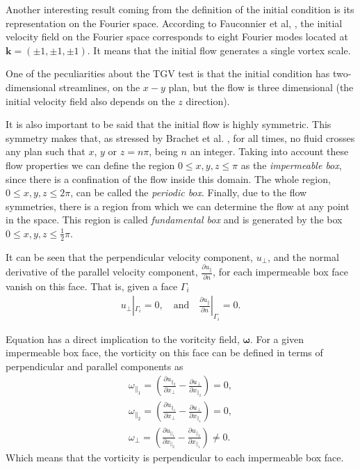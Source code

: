 Another interesting result coming from the definition of the initial condition  is its representation on the Fourier space. According to Fauconnier et al, \cite{fauconnier_construction_2009}, the initial velocity field on the Fourier space corresponds to eight Fourier modes located at $\mathbf{k}=(\pm1,\pm1,\pm1)$. It means that the initial flow generates a single  vortex scale.

One of the peculiarities about the TGV test is that the initial condition has two-dimensional streamlines, on the $x-y$ plan, but the flow is three dimensional (the initial velocity field also depends on the $z$ direction). 

It is also important to be said that the initial flow is highly symmetric. This symmetry makes that, as stressed by Brachet et al. \cite{brachet_small-scale_1983}, for all times, no fluid crosses any plan such that $x$, $y$ or $z=n\pi$, being $n$ an integer. Taking into account these flow properties we can define the region $0\leq x,y,z\leq\pi$ as the \textit{impermeable box}, since there is a confination of the flow inside this domain. The whole region, $0\leq x,y,z\leq2\pi$, can be called the \textit{periodic box}. Finally, due to the flow symmetries, there is a region from which we can determine the flow at any point in the space. This region is called \textit{fundamental box} and is generated by the box $0\leq x,y,z\leq\frac{1}{2}\pi$.

It can be seen that the perpendicular velocity component, $u_\perp$, and the normal derivative of the parallel velocity component, $\frac{\partial u_\parallel}{\partial n}$, for each impermeable box face vanish on this face. That is, given a face $\Gamma_i$
\begin{align}
\label{eq-TGV_u_perp}
u_\perp|_{\Gamma_i}=0,\quad\mbox{and}\quad\frac{\partial u_\parallel}{\partial n}|_{\Gamma_i}=0.
\end{align}

Equation  has a direct implication to the voritcity field, $\boldsymbol{\omega}$. For a given impermeable box face, the vorticity on this face can be defined in terms of perpendicular and parallel components as
\begin{align}
\label{eq-TGV_vorticity}
\omega_{\parallel_1}=\left(\frac{\partial u_{\parallel_2}}{\partial x_\perp}-\frac{\partial u_\perp}{\partial x_{\parallel_2}}\right)=0,\\\nonumber
\omega_{\parallel_2}=\left(\frac{\partial u_{\parallel_1}}{\partial x_\perp}-\frac{\partial u_\perp}{\partial x_{\parallel_1}}\right)=0,\\\nonumber
\omega_\perp=\left(\frac{\partial u_{\parallel_1}}{\partial x_{\parallel_2}}-\frac{\partial u_{\parallel_2}}{\partial x_{\parallel_1}}\right)\neq0.
\end{align}
Which means that the vorticity is perpendicular to each impermeable box face.

